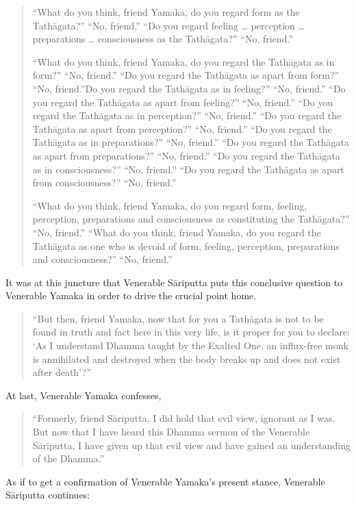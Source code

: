 \begin{quote}
``What do you think, friend Yamaka, do you regard form as the Tathāgata?'' ``No, friend.'' ``Do you regard feeling \ldots{} perception \ldots{} preparations \ldots{} consciousness as the Tathāgata?'' ``No, friend.''

``What do you think, friend Yamaka, do you regard the Tathāgata as in form?'' ``No, friend.'' ``Do you regard the Tathāgata as apart from form?'' ``No, friend.''Do you regard the Tathāgata as in feeling?'' ``No, friend.'' ``Do you regard the Tathāgata as apart from feeling?'' ``No, friend.'' ``Do you regard the Tathāgata as in perception?'' ``No, friend.'' ``Do you regard the Tathāgata as apart from perception?'' ``No, friend.'' ``Do you regard the Tathāgata as in preparations?'' ``No, friend.'' ``Do you regard the Tathāgata as apart from preparations?'' ``No, friend.'' ``Do you regard the Tathāgata as in consciousness?'' ``No, friend.'' ``Do you regard the Tathāgata as apart from consciousness?'' ``No, friend.''

``What do you think, friend Yamaka, do you regard form, feeling, perception, preparations and consciousness as constituting the Tathāgata?'' ``No, friend.'' ``What do you think, friend Yamaka, do you regard the Tathāgata as one who is devoid of form, feeling, perception, preparations and consciousness?'' ``No, friend.''
\end{quote}

It was at this juncture that Venerable Sāriputta puts this conclusive question to Venerable Yamaka in order to drive the crucial point home.

\begin{quote}
``But then, friend Yamaka, now that for you a Tathāgata is not to be found in truth and fact here in this very life, is it proper for you to declare: `As I understand Dhamma taught by the Exalted One, an influx-free monk is annihilated and destroyed when the body breaks up and does not exist after death'?''
\end{quote}

At last, Venerable Yamaka confesses,

\begin{quote}
``Formerly, friend Sāriputta, I did hold that evil view, ignorant as I was. But now that I have heard this Dhamma sermon of the Venerable Sāriputta, I have given up that evil view and have gained an understanding of the Dhamma.''
\end{quote}

As if to get a confirmation of Venerable Yamaka's present stance, Venerable Sāriputta continues:

